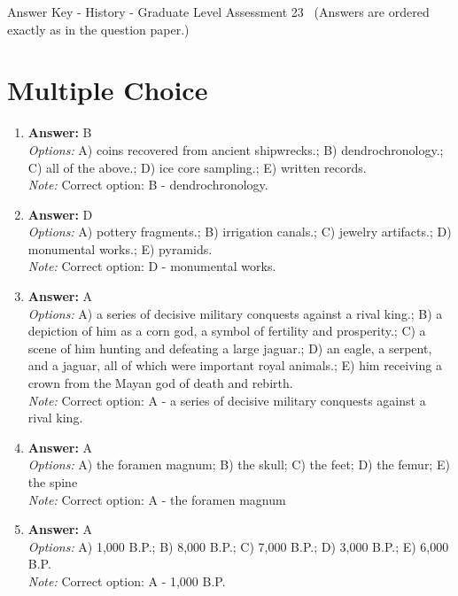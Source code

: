 \documentclass[12pt]{article}
\begin{document}
\begin{center}
Answer Key - History - Graduate Level Assessment 23 \
\small (Answers are ordered exactly as in the question paper.)
\end{center}

\section*{Multiple Choice}
\begin{enumerate}[label=\arabic*.]
\item \textbf{Answer:} B
\\ \textit{Options:} A) coins recovered from ancient shipwrecks.; B) dendrochronology.; C) all of the above.; D) ice core sampling.; E) written records.
\\ \textit{Note:} Correct option: B - dendrochronology.
\item \textbf{Answer:} D
\\ \textit{Options:} A) pottery fragments.; B) irrigation canals.; C) jewelry artifacts.; D) monumental works.; E) pyramids.
\\ \textit{Note:} Correct option: D - monumental works.
\item \textbf{Answer:} A
\\ \textit{Options:} A) a series of decisive military conquests against a rival king.; B) a depiction of him as a corn god, a symbol of fertility and prosperity.; C) a scene of him hunting and defeating a large jaguar.; D) an eagle, a serpent, and a jaguar, all of which were important royal animals.; E) him receiving a crown from the Mayan god of death and rebirth.
\\ \textit{Note:} Correct option: A - a series of decisive military conquests against a rival king.
\item \textbf{Answer:} A
\\ \textit{Options:} A) the foramen magnum; B) the skull; C) the feet; D) the femur; E) the spine
\\ \textit{Note:} Correct option: A - the foramen magnum
\item \textbf{Answer:} A
\\ \textit{Options:} A) 1,000 B.P.; B) 8,000 B.P.; C) 7,000 B.P.; D) 3,000 B.P.; E) 6,000 B.P.
\\ \textit{Note:} Correct option: A - 1,000 B.P.
\end{enumerate}
\end{document}
